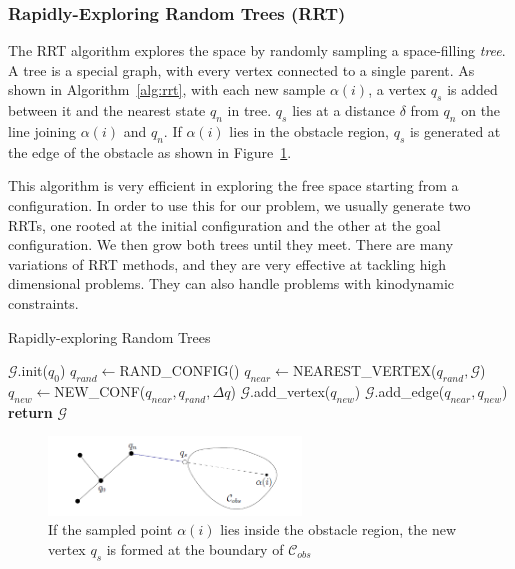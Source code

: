 \subsubsection{Rapidly-Exploring Random Trees (RRT)}
The RRT algorithm explores the space by randomly sampling a space-filling \textit{tree}. A tree is a special graph, with every vertex connected to a single parent. As shown in Algorithm~\ref{alg:rrt}, with each new sample $\alpha(i)$, a vertex $q_s$ is added between it and the nearest state $q_n$ in tree. $q_s$ lies at a distance $\delta$ from $q_n$ on the line joining $\alpha(i)$ and $q_n$. If $\alpha(i)$ lies in the obstacle region, $q_s$ is generated at the edge of the obstacle as shown in Figure~\ref{fig:rrt}. 

This algorithm is very efficient in exploring the free space starting from a configuration. In order to use this for our problem, we usually generate two RRTs, one rooted at the initial configuration and the other at the goal configuration. We then grow both trees until they meet. There are many variations of RRT methods, and they are very effective at tackling high dimensional problems. They can also handle problems with kinodynamic constraints.

\begin{algorithm}
\caption{Rapidly-exploring Random Trees}\label{alg:rrt}
\begin{algorithmic}[1]
\State $\mathcal{G}$.init($q_0$)
\State $q_{rand}\gets$RAND\_CONFIG()
\State $q_{near}\gets$NEAREST\_VERTEX($q_{rand},\mathcal{G}$)
\State $q_{new}\gets$NEW\_CONF($q_{near}, q_{rand}, \Delta q$)
\State $\mathcal{G}$.add\_vertex($q_{new}$)
\State $\mathcal{G}$.add\_edge($q_{near},q_{new}$)
\EndFor
\State \textbf{return} $\mathcal{G}$
\end{algorithmic}
\end{algorithm}

\begin{figure}
\centering
\includegraphics[width=0.6\textwidth]{./images/rrt}
\caption[Tree expansion in RRT]{If the sampled point $\alpha(i)$ lies inside the obstacle region, the new vertex $q_s$ is formed at the boundary of $\mathcal{C}_{obs}$}
\label{fig:rrt}
\end{figure}

